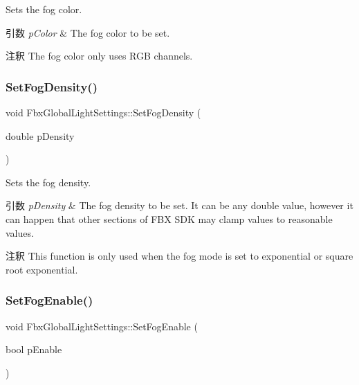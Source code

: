 Sets the fog color. 
\begin{DoxyParams}{引数}
{\em p\+Color} & The fog color to be set. \\
\hline
\end{DoxyParams}
\begin{DoxyRemark}{注釈}
The fog color only uses R\+GB channels. 
\end{DoxyRemark}
\mbox{\label{class_fbx_global_light_settings_a9aa9fb5c44351b8b4ef9caf1968ca32f}} 
\subsubsection{\texorpdfstring{Set\+Fog\+Density()}{SetFogDensity()}}
{\footnotesize\ttfamily void Fbx\+Global\+Light\+Settings\+::\+Set\+Fog\+Density (\begin{DoxyParamCaption}\item[{double}]{p\+Density }\end{DoxyParamCaption})}

Sets the fog density. 
\begin{DoxyParams}{引数}
{\em p\+Density} & The fog density to be set. It can be any double value, however it can happen that other sections of F\+BX S\+DK may clamp values to reasonable values. \\
\hline
\end{DoxyParams}
\begin{DoxyRemark}{注釈}
This function is only used when the fog mode is set to exponential or square root exponential. 
\end{DoxyRemark}
\mbox{\label{class_fbx_global_light_settings_a8236e86da20394c673183e762760d6f0}} 
\subsubsection{\texorpdfstring{Set\+Fog\+Enable()}{SetFogEnable()}}
{\footnotesize\ttfamily void Fbx\+Global\+Light\+Settings\+::\+Set\+Fog\+Enable (\begin{DoxyParamCaption}\item[{bool}]{p\+Enable }\end{DoxyParamCaption})}

